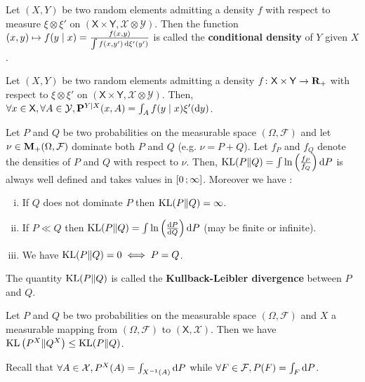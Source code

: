 	\begin{defn}
		Let $(X,Y)$ be two random elements admitting a density $f$ with respect to measure $\xi \otimes \xi'$ on $(\mathsf{X} \times \mathsf{Y}, \mathcal{X} \otimes \mathcal{Y})$.
		Then the function $(x,y) \mapsto f(y \mid x) = \frac{f(x,y)}{\int f(x,y') \mathop{}\mathopen{}\mathrm{d} \xi'(y')}$ is called the \textbf{conditional density} of $Y$ given $X$.
	\end{defn}

	\begin{thm}
		Let $(X,Y)$ be two random elements admitting a density $f \colon \mathsf{X} \times \mathsf{Y} \to \mathbf{R}_+$ with respect to $\xi \otimes \xi'$ on $(\mathsf{X} \times \mathsf{Y}, \mathcal{X} \otimes \mathcal{Y})$.
		Then, $\forall  x \in \mathsf{X}, \forall A \in \mathcal{Y}, \mathbf{P}^{Y \mid X}(x,A) = \int_A f(y \mid x) \xi'(\mathop{}\mathopen{}\mathrm{d} y)$.
	\end{thm}
	
	\begin{lem}
		Let $P$ and $Q$ be two probabilities on the measurable space $(\Omega,\mathcal{F})$ and let $\nu \in \mathbf{M}_+(\Omega,\mathcal{F})$ dominate both $P$ and $Q$ (e.g. $\nu = P + Q$).
		Let $f_P$ and $f_Q$ denote the densities of $P$ and $Q$ with respect to $\nu$.
		Then, $\operatorname{KL}(P \| Q) = \int \ln \left( \frac{f_P}{f_Q} \right) \mathop{}\mathopen{}\mathrm{d} P$ is always well defined and takes values in $\mathopen{}\mathclose{\left[0\mathclose{}\mathpunct{};\infty\right]}$.
		Moreover we have :
		\begin{enumerate}[(i)]
			\item If $Q$ does not dominate $P$ then $\operatorname{KL}(P \| Q) = \infty$.
			\item If $P \ll Q$ then $\operatorname{KL}(P \| Q) = \int \ln \left( \frac{\mathop{}\mathopen{}\mathrm{d} P}{\mathop{}\mathopen{}\mathrm{d} Q} \right) \mathop{}\mathopen{}\mathrm{d} P$ (may be finite or infinite).
			\item We have $\operatorname{KL}(P \| Q) = 0 \iff P = Q$.
		\end{enumerate}
	\end{lem}

	\begin{defn}
		The quantity $\operatorname{KL}(P \| Q)$ is called the \textbf{Kullback-Leibler divergence} between $P$ and $Q$.
	\end{defn}

	\begin{thm}
		Let $P$ and $Q$ be two probabilities on the measurable space $(\Omega,\mathcal{F})$ and $X$ a measurable mapping from $(\Omega,\mathcal{F})$ to $(\mathsf{X},\mathcal{X})$.
		Then we have $\operatorname{KL} \left( P^X \| Q^X \right) \leq \operatorname{KL}(P \| Q)$.
	\end{thm}

	\begin{rem}
		Recall that $\forall A \in \mathcal{X}, P^X(A) = \int_{X^{-1}(A)} \mathop{}\mathopen{}\mathrm{d} P$ while $\forall F \in \mathcal{F}, P(F) = \int_F \mathop{}\mathopen{}\mathrm{d} P$.
	\end{rem}
